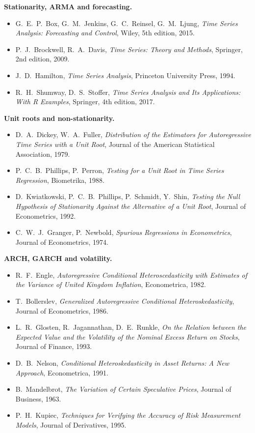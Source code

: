 \documentclass[a4paper,11pt,oneside]{book}
\begin{document}
\noindent\textbf{Stationarity, ARMA and forecasting.}
\begin{itemize}
  \item G.~E.~P.~Box, G.~M.~Jenkins, G.~C.~Reinsel, G.~M.~Ljung,
        \emph{Time Series Analysis: Forecasting and Control},
        Wiley, 5th edition, 2015.
  \item P.~J.~Brockwell, R.~A.~Davis, \emph{Time Series: Theory
        and Methods}, Springer, 2nd edition, 2009.
  \item J.~D.~Hamilton, \emph{Time Series Analysis}, Princeton
        University Press, 1994.
  \item R.~H.~Shumway, D.~S.~Stoffer, \emph{Time Series Analysis
        and Its Applications: With R Examples}, Springer, 4th
        edition, 2017.
\end{itemize}

\noindent\textbf{Unit roots and non-stationarity.}
\begin{itemize}
  \item D.~A.~Dickey, W.~A.~Fuller, \emph{Distribution of the
        Estimators for Autoregressive Time Series with a Unit
        Root}, Journal of the American Statistical Association,
        1979.
  \item P.~C.~B.~Phillips, P.~Perron, \emph{Testing for a Unit
        Root in Time Series Regression}, Biometrika, 1988.
  \item D.~Kwiatkowski, P.~C.~B.~Phillips, P.~Schmidt, Y.~Shin,
        \emph{Testing the Null Hypothesis of Stationarity Against
        the Alternative of a Unit Root}, Journal of Econometrics,
        1992.
  \item C.~W.~J.~Granger, P.~Newbold, \emph{Spurious Regressions
        in Econometrics}, Journal of Econometrics, 1974.
\end{itemize}

\noindent\textbf{ARCH, GARCH and volatility.}
\begin{itemize}
  \item R.~F.~Engle, \emph{Autoregressive Conditional
        Heteroscedasticity with Estimates of the Variance of
        United Kingdom Inflation}, Econometrica, 1982.
  \item T.~Bollerslev, \emph{Generalized Autoregressive
        Conditional Heteroskedasticity}, Journal of Econometrics,
        1986.
  \item L.~R.~Glosten, R.~Jagannathan, D.~E.~Runkle, \emph{On the
        Relation between the Expected Value and the Volatility of
        the Nominal Excess Return on Stocks}, Journal of
        Finance, 1993.
  \item D.~B.~Nelson, \emph{Conditional Heteroskedasticity in
        Asset Returns: A New Approach}, Econometrica, 1991.
  \item B.~Mandelbrot, \emph{The Variation of Certain Speculative
        Prices}, Journal of Business, 1963.
  \item P.~H.~Kupiec, \emph{Techniques for Verifying the
        Accuracy of Risk Measurement Models}, Journal of
        Derivatives, 1995.
\end{itemize}
\end{document}
